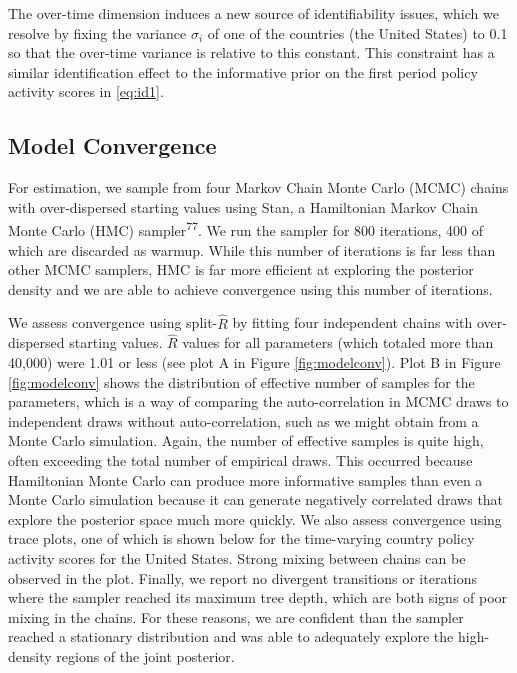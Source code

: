 \documentclass[]{article}
\begin{document}
The over-time dimension induces a new source of identifiability issues, which we resolve by fixing the variance \(\sigma_i\) of one of the countries (the United States) to 0.1 so that the over-time variance is relative to this constant. This constraint has a similar identification effect to the informative prior on the first period policy activity scores in \eqref{eq:id1}.

\hypertarget{model-convergence}{%
\subsection*{Model Convergence}\label{model-convergence}}

For estimation, we sample from four Markov Chain Monte Carlo (MCMC) chains with over-dispersed starting values using Stan, a Hamiltonian Markov Chain Monte Carlo (HMC) sampler\textsuperscript{77}. We run the sampler for 800 iterations, 400 of which are discarded as warmup. While this number of iterations is far less than other MCMC samplers, HMC is far more efficient at exploring the posterior density and we are able to achieve convergence using this number of iterations.

We assess convergence using split-\(\hat{R}\) by fitting four independent chains with over-dispersed starting values. \(\hat{R}\) values for all parameters (which totaled more than 40,000) were 1.01 or less (see plot A in Figure \ref{fig:modelconv}). Plot B in Figure \ref{fig:modelconv} shows the distribution of effective number of samples for the parameters, which is a way of comparing the auto-correlation in MCMC draws to independent draws without auto-correlation, such as we might obtain from a Monte Carlo simulation. Again, the number of effective samples is quite high, often exceeding the total number of empirical draws. This occurred because Hamiltonian Monte Carlo can produce more informative samples than even a Monte Carlo simulation because it can generate negatively correlated draws that explore the posterior space much more quickly. We also assess convergence using trace plots, one of which is shown below for the time-varying country policy activity scores for the United States. Strong mixing between chains can be observed in the plot. Finally, we report no divergent transitions or iterations where the sampler reached its maximum tree depth, which are both signs of poor mixing in the chains. For these reasons, we are confident than the sampler reached a stationary distribution and was able to adequately explore the high-density regions of the joint posterior.
\end{document}

